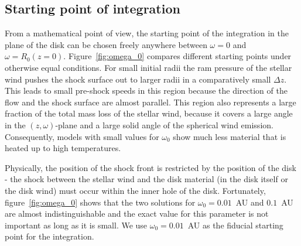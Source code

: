 \subsection{Starting point of integration}
\label{sect:omega0}
From a mathematical point of view, the starting point of the integration in the plane of the disk can be chosen freely anywhere between $\omega=0$ and $\omega=R_0(z=0)$. Figure~\ref{fig:omega_0} compares different starting points under otherwise equal conditions. For small initial radii the ram pressure of the stellar wind pushes the shock surface out to larger radii in a comparatively small $\Delta z$. This leads to small pre-shock speeds in this region because the direction of the flow and the shock surface are almost parallel. This region also represents a large fraction of the total mass loss of the stellar wind, because it covers a large angle in the $(z,\omega)$-plane and a large solid angle of the spherical wind emission. Consequently, models with small values for $\omega_0$ show much less material that is heated up to high temperatures. 

Physically, the position of the shock front is restricted by the position of the disk - the shock between the stellar wind and the disk material (in the disk itself or the disk wind) must occur within the inner hole of the disk. Fortunately, figure~\ref{fig:omega_0} shows that the two solutions for $\omega_0=0.01$~AU and $0.1$~AU are almost indistinguishable and the exact value for this parameter is not important as long as it is small. We use $\omega_0 = 0.01$~AU as the fiducial starting point for the integration.